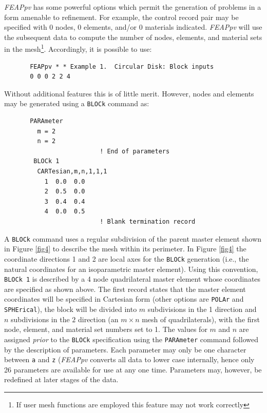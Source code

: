 {\sl FEAPpv} has some powerful options which permit the generation of
problems in a form amenable to refinement.  For example, the control
record pair may be specified with 0 nodes, 0 elements, and/or 0 materials
indicated.  {\sl FEAPpv} will
use the subsequent data to compute the number of nodes, elements, and material
sets in the
mesh\footnote{If user mesh functions are employed this feature may
not work correctly}.  Accordingly, it is possible to use:
\begin{verbatim}
       FEAPpv * * Example 1.  Circular Disk: Block inputs
       0 0 0 2 2 4
\end{verbatim}
Without additional features this is of little merit.  However, nodes
and elements may be generated using a {\tt BLOCk} command as:
\begin{verbatim}
       PARAmeter
         m = 2
         n = 2
                          ! End of parameters
        BLOCk 1
         CARTesian,m,n,1,1,1
           1  0.0  0.0
           2  0.5  0.0
           3  0.4  0.4
           4  0.0  0.5
                          ! Blank termination record
\end{verbatim}
A {\tt BLOCk}  command uses a regular subdivision of the parent master
element shown in Figure \ref{fig4} to describe the mesh within its perimeter.
In Figure \ref{fig4} the coordinate directions 1 and 2 are local axes for
the {\tt BLOCk} generation (i.e., the natural coordinates for an isoparametric
master element). Using this convention, {\tt BLOCk 1} is described
by a 4 node quadrilateral master element whose coordinates are specified
as shown above.  The first record states that the master element coordinates
will be specified in Cartesian form (other options are {\tt POLAr} and
{\tt SPHErical}), the block will be divided into
$m$ subdivisions in the 1 direction and $n$ subdivisions in the $2$
direction (an $m \times n$ mesh of
quadrilaterals), with the first node, element, and material set
numbers set to 1. The values for $m$ and $n$ are assigned {\it prior} to the
{\tt BLOCk} specification using the {\tt PARAmeter} command followed by
the description of parameters.  Each parameter may only be one
character between {\tt a} and {\tt z} ({\sl FEAPpv} converts all data to lower
case internally, hence only 26 parameters are available for use at any one
time.  Parameters may, however, be redefined at later stages of the data.

